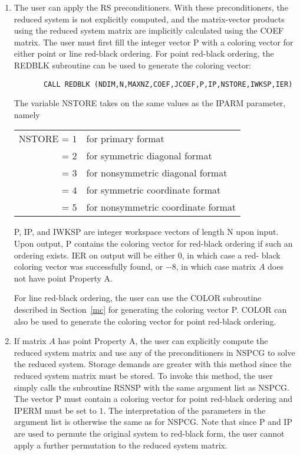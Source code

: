 \begin{enumerate}
       \item
       The user can apply the RS preconditioners.  With these
       preconditioners, the reduced system is not explicitly
       computed, and the matrix-vector products using the reduced
       system matrix are implicitly calculated using the COEF
       matrix.  The user must first fill the integer vector P
       with a coloring vector for either point or line
       red-black ordering.  For point red-black ordering, the
       REDBLK subroutine can be used to generate the coloring
       vector:
       \begin{verbatim}
       CALL REDBLK (NDIM,N,MAXNZ,COEF,JCOEF,P,IP,NSTORE,IWKSP,IER)  
       \end{verbatim}
       The variable NSTORE takes on the same values as the IPARM
       parameter, namely
 
       \begin{tabular}{rl}
            NSTORE = $1$ & for primary format \\
                   = $2$ & for symmetric diagonal format \\
                   = $3$ & for nonsymmetric diagonal format \\
                   = $4$ & for symmetric coordinate format \\
                   = $5$ & for nonsymmetric coordinate format
       \end{tabular}
 
       P, IP, and IWKSP are integer workspace vectors of length
       N upon input.  Upon output, P contains the coloring
       vector for red-black ordering if such an ordering exists.
       IER on output will be either $0$, in which case a red-
       black coloring vector was successfully found, or $-8$,
       in which case matrix $A$ does not have point Property A.
 
       For line red-black ordering, the user can use the COLOR
       subroutine described in Section~\ref{mc} for generating the
       coloring vector P.  COLOR can also be used to generate
       the coloring vector for point red-black ordering.
 
       \item
       If matrix $A$ has point Property A, the user can explicitly
       compute the reduced system matrix and use any of the
       preconditioners in NSPCG to solve the reduced system.
       Storage demands are greater with this method since the
       reduced system matrix must be stored.  To invoke this
       method, the user simply calls the subroutine RSNSP with
       the same argument list as NSPCG.  The vector P must contain
       a coloring vector for point red-black ordering and IPERM
       must be set to $1$.  The interpretation of the parameters
       in the argument list is otherwise the same as for NSPCG.
       Note that since P and IP are used to permute the original
       system to red-black form, the user cannot apply a further
       permutation to the reduced system matrix.
\end{enumerate}
 
